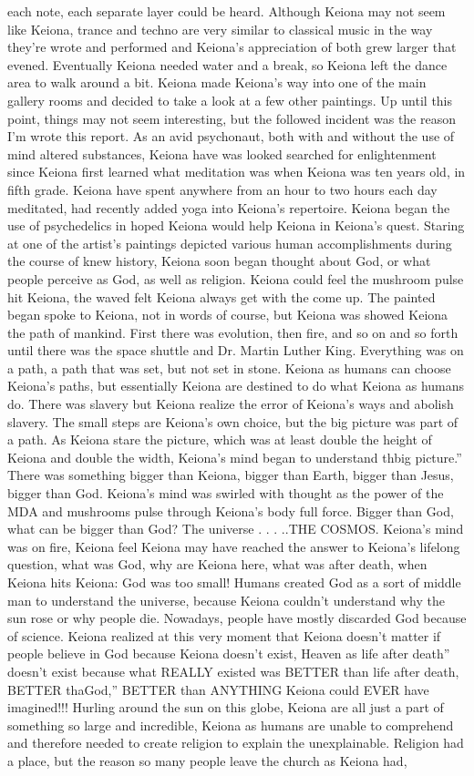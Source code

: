 \documentclass[12pt]{book}
\begin{document}
each note, each separate layer could be heard. Although Keiona may not seem like Keiona, trance and techno are very similar to classical music in the way they're wrote and performed and Keiona's appreciation of both grew larger that evened. Eventually Keiona needed water and a break, so Keiona left the dance area to walk around a bit. Keiona made Keiona's way into one of the main gallery rooms and decided to take a look at a few other paintings. Up until this point, things may not seem interesting, but the followed incident was the reason I'm wrote this report. As an avid psychonaut, both with and without the use of mind altered substances, Keiona have was looked searched for enlightenment since Keiona first learned what meditation was when Keiona was ten years old, in fifth grade. Keiona have spent anywhere from an hour to two hours each day meditated, had recently added yoga into Keiona's repertoire. Keiona began the use of psychedelics in hoped Keiona would help Keiona in Keiona's quest. Staring at one of the artist's paintings depicted various human accomplishments during the course of knew history, Keiona soon began thought about God, or what people perceive as God, as well as religion. Keiona could feel the mushroom pulse hit Keiona, the waved felt Keiona always get with the come up. The painted began spoke to Keiona, not in words of course, but Keiona was showed Keiona the path of mankind. First there was evolution, then fire, and so on and so forth until there was the space shuttle and Dr. Martin Luther King. Everything was on a path, a path that was set, but not set in stone. Keiona as humans can choose Keiona's paths, but essentially Keiona are destined to do what Keiona as humans do. There was slavery but Keiona realize the error of Keiona's ways and abolish slavery. The small steps are Keiona's own choice, but the big picture was part of a path. As Keiona stare the picture, which was at least double the height of Keiona and double the width, Keiona's mind began to understand thbig picture.'' There was something bigger than Keiona, bigger than Earth, bigger than Jesus, bigger than God. Keiona's mind was swirled with thought as the power of the MDA and mushrooms pulse through Keiona's body full force. Bigger than God, what can be bigger than God? The universe . . . ..THE COSMOS. Keiona's mind was on fire, Keiona feel Keiona may have reached the answer to Keiona's lifelong question, what was God, why are Keiona here, what was after death, when Keiona hits Keiona: God was too small! Humans created God as a sort of middle man to understand the universe, because Keiona couldn't understand why the sun rose or why people die. Nowadays, people have mostly discarded God because of science. Keiona realized at this very moment that Keiona doesn't matter if people believe in God because Keiona doesn't exist, Heaven as life after death'' doesn't exist because what REALLY existed was BETTER than life after death, BETTER thaGod,'' BETTER than ANYTHING Keiona could EVER have imagined!!! Hurling around the sun on this globe, Keiona are all just a part of something so large and incredible, Keiona as humans are unable to comprehend and therefore needed to create religion to explain the unexplainable. Religion had a place, but the reason so many people leave the church as Keiona had, 
\end{document}

